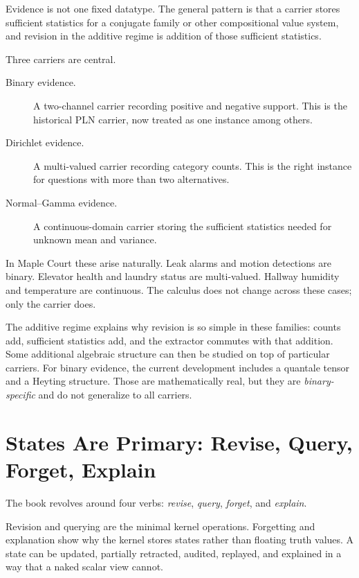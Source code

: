 Evidence is not one fixed datatype.  The general pattern is that a carrier
stores sufficient statistics for a conjugate family or other compositional value
system, and revision in the additive regime is addition of those sufficient
statistics.

Three carriers are central.

\begin{description}
\item[Binary evidence.]  A two-channel carrier recording positive and negative
  support.  This is the historical PLN carrier, now treated as one instance
  among others.
\item[Dirichlet evidence.]  A multi-valued carrier recording category counts.
  This is the right instance for questions with more than two alternatives.
\item[Normal--Gamma evidence.]  A continuous-domain carrier storing the
  sufficient statistics needed for unknown mean and variance.
\end{description}

In Maple Court these arise naturally.  Leak alarms and motion detections are
binary.  Elevator health and laundry status are multi-valued.  Hallway
humidity and temperature are continuous.  The calculus does not change across
these cases; only the carrier does.

The additive regime explains why revision is so simple in these families:
counts add, sufficient statistics add, and the extractor commutes with that
addition.  Some additional algebraic structure can then be studied on top of
particular carriers.  For binary evidence, the current development includes a
quantale tensor and a Heyting structure.  Those are mathematically real, but
they are \emph{binary-specific} and do not generalize to all carriers.

\section{States Are Primary: Revise, Query, Forget, Explain}
\label{sec:overview-four-verbs}

The book revolves around four verbs:
\emph{revise}, \emph{query}, \emph{forget}, and \emph{explain}.

Revision and querying are the minimal kernel operations.  Forgetting and
explanation show why the kernel stores states rather than floating truth values.
A state can be updated, partially retracted, audited, replayed, and explained in
a way that a naked scalar view cannot.

